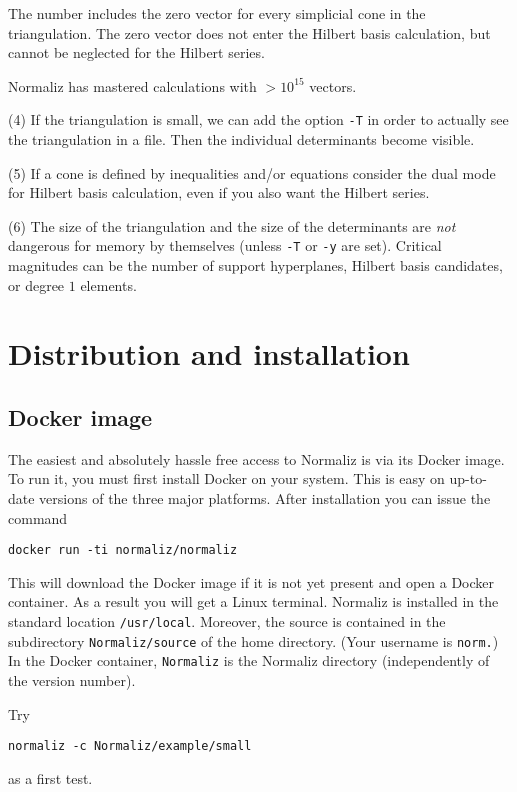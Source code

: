 \documentclass[12pt,a4paper]{scrartcl}
\theoremstyle{definition}
\def\ttt{\texttt}
\begin{document}
The number includes the zero vector for every simplicial cone
in the triangulation. The zero vector does not enter the
Hilbert basis calculation, but cannot be neglected for the
Hilbert series.

Normaliz has mastered calculations with $> 10^{15}$ vectors.

(4) If the triangulation is small, we can add the option
\ttt{-T} in order to actually see the triangulation in a file.
Then the individual determinants become visible.

(5) If a cone is defined by inequalities and/or equations
consider the dual mode for Hilbert basis calculation, even if
you also want the Hilbert series.

(6) The size of the triangulation and the size of the
determinants are \emph{not} dangerous for memory by themselves
(unless \ttt{-T} or \ttt{-y} are set). Critical magnitudes can
be the number of support hyperplanes, Hilbert basis candidates,
or degree $1$ elements.


\section{Distribution and installation}\label{Distr}

\subsection{Docker image}
The easiest and absolutely hassle free access to Normaliz is via its Docker image. To run it, you must first install Docker on your system. This is easy on up-to-date versions of the three major platforms. After installation you can issue the command
\begin{Verbatim}
docker run -ti normaliz/normaliz
\end{Verbatim}
This will download the Docker image if it is not yet present and open a Docker container. As a result you will get a Linux terminal. Normaliz is installed in the standard location \verb|/usr/local|. Moreover, the source is contained in the subdirectory \verb|Normaliz/source| of the home directory. (Your username is \verb|norm.|) In the Docker container, \verb|Normaliz| is the Normaliz directory (independently of the version number).

Try
\begin{Verbatim}
normaliz -c Normaliz/example/small
\end{Verbatim}
as a first test.
\end{document}
